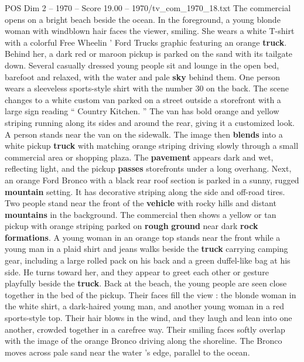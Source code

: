 \begin{textsample}{POS Dim 2 – 1970 – Score 19.00 – 1970/tv\_com\_1970\_18.txt}  \label{ex:f2_pos_072}
The commercial opens on a bright beach beside the ocean.
In the foreground, a young blonde woman with windblown hair faces the viewer, smiling.
She wears a white T-shirt with a colorful Free Wheelin ’ Ford Trucks graphic featuring an orange \textbf{truck}.
Behind her, a dark red or maroon pickup is parked on the sand with its tailgate down.
Several casually dressed young people sit and lounge in the open bed, barefoot and relaxed, with the water and pale \textbf{sky} behind them.
One person wears a sleeveless sports-style shirt with the number 30 on the back.
The scene changes to a white custom van parked on a street outside a storefront with a large sign reading “ Country Kitchen. ” The van has bold orange and yellow striping running along its sides and around the rear, giving it a customized look.
A person stands near the van on the sidewalk.
The image then \textbf{blends} into a white pickup \textbf{truck} with matching orange striping driving slowly through a small commercial area or shopping plaza.
The \textbf{pavement} appears dark and wet, reflecting light, and the pickup \textbf{passes} storefronts under a long overhang.
Next, an orange Ford Bronco with a black rear roof section is parked in a sunny, rugged \textbf{mountain} setting.
It has decorative striping along the side and off-road tires.
Two people stand near the front of the \textbf{vehicle} with rocky hills and distant \textbf{mountains} in the background.
The commercial then shows a yellow or tan pickup with orange striping parked on \textbf{rough} \textbf{ground} near dark \textbf{rock} \textbf{formations}.
A young woman in an orange top stands near the front while a young man in a plaid shirt and jeans walks beside the \textbf{truck} carrying camping gear, including a large rolled pack on his back and a green duffel-like bag at his side.
He turns toward her, and they appear to greet each other or gesture playfully beside the \textbf{truck}.
Back at the beach, the young people are seen close together in the bed of the pickup.
Their faces fill the view : the blonde woman in the white shirt, a dark-haired young man, and another young woman in a red sports-style top.
Their hair blows in the wind, and they laugh and lean into one another, crowded together in a carefree way.
Their smiling faces softly overlap with the image of the orange Bronco driving along the shoreline.
The Bronco moves across pale sand near the water ’s edge, parallel to the ocean.

\end{textsample}
